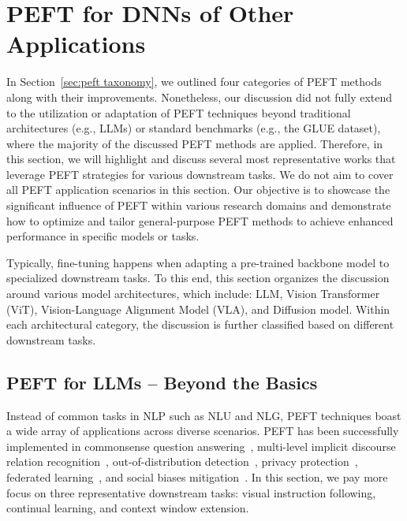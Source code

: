 \section{PEFT for DNNs of Other Applications }
\label{sec:peft application}

In Section~\ref{sec:peft taxonomy}, we outlined four categories of PEFT methods along with their improvements. Nonetheless, our discussion did not fully extend to the utilization or adaptation of PEFT techniques beyond traditional architectures (e.g., LLMs) or standard benchmarks (e.g., the GLUE dataset), where the majority of the discussed PEFT methods are applied.
Therefore, in this section, we will highlight and discuss several most representative works that leverage PEFT strategies for various downstream tasks.
We do not aim to cover all PEFT application scenarios in this section.
Our objective is to showcase the significant influence of PEFT within various research domains and demonstrate how to optimize and tailor general-purpose PEFT methods to achieve enhanced performance in specific models or tasks. 

Typically, fine-tuning happens when adapting a pre-trained backbone model to specialized downstream tasks. 
To this end, this section organizes the discussion around various model architectures, which include: LLM, Vision Transformer (ViT), Vision-Language Alignment Model (VLA), and Diffusion model. Within each architectural category, the discussion is further classified based on different downstream tasks.

\subsection{PEFT for LLMs -- Beyond the Basics}
\label{peft_on_llms}

Instead of common tasks in NLP such as NLU and NLG, PEFT techniques boast a wide array of applications across diverse scenarios. PEFT has been successfully implemented in commonsense question answering~\cite{huang2023mvp, zhao2023knowledgeable}, multi-level implicit discourse relation recognition~\cite{zhao2023infusing}, out-of-distribution detection~\cite{ouyang2023prefix}, privacy protection~\cite{ozdayi2023controlling,xiao2023offsite}, federated learning~\cite{che2023federated}, and social biases mitigation~\cite{li2023prompt}. In this section, we pay more focus on three representative downstream tasks: visual instruction following, continual learning, and context window extension.

